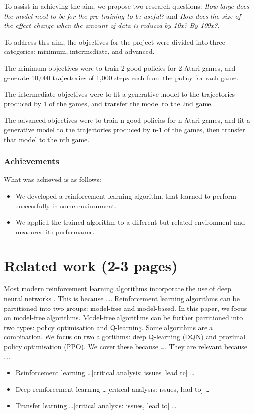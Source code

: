 \documentclass[12pt,a4paper]{article}
\begin{document}
To assist in achieving the aim, we propose two research questions: \textit{How large does the model need to be for the pre-training to be useful?} and \textit{How does the size of the effect change when the amount of data is reduced by 10x? By 100x?}.

To address this aim, the objectives for the project were divided into three categories: minimum, intermediate, and advanced. 

The minimum objectives were to train 2 good policies for 2 Atari games, and generate 10,000 trajectories of 1,000 steps each from the policy for each game.

The intermediate objectives were to fit a generative model to the trajectories produced by 1 of the games, and transfer the model to the 2nd game.

The advanced objectives were to train n good policies for n Atari games, and fit a generative model to the trajectories produced by n-1 of the games, then transfer that model to the nth game.

\subsubsection{Achievements}
What was achieved is as follows:
\begin{itemize}
    \item We developed a reinforcement learning algorithm that learned to perform successfully in some environment.
    \item We applied the trained algorithm to a different but related environment and measured its performance.
\end{itemize}

\newpage
\section{Related work (2-3 pages)}
\label{section:related-work}
Most modern reinforcement learning algorithms incorporate the use of deep neural networks \cite{}. This is because \dots. Reinforcement learning algorithms can be partitioned into two groups: model-free and model-based. In this paper, we focus on model-free algorithms. Model-free algorithms can be further partitioned into two types: policy optimisation and Q-learning. Some algorithms are a combination. We focus on two algorithms: deep Q-learning (DQN) and proximal policy optimisation (PPO). We cover these because \dots. They are relevant because \dots. 

\begin{itemize}
    \item Reinforcement learning \dots [critical analysis: issues, lead to] \dots
    \item Deep reinforcement learning \dots [critical analysis: issues, lead to] \dots
    \item Transfer learning \dots [critical analysis: issues, lead to] \dots
\end{itemize}
\end{document}
